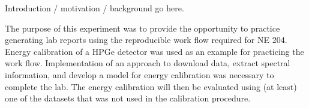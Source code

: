 Introduction / motivation / background go here.

The purpose of this experiment was to provide the opportunity to practice generating lab reports using the reproducible work flow
required for NE 204. Energy calibration of a HPGe detector was used as an example for practicing the work flow. Implementation of
an approach to download data, extract spectral information, and develop a model for energy calibration was necessary to complete
the lab. The energy calibration will then be evaluated using (at least) one of the datasets that was not used in the calibration
procedure.
